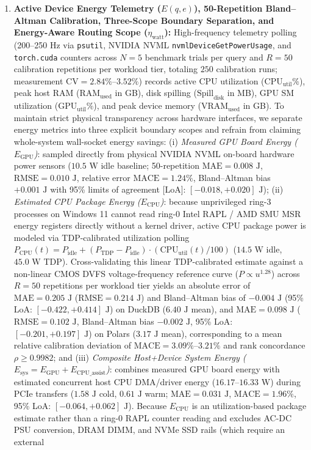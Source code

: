\documentclass[10pt,a4paper]{article}
\begin{document}
\begin{enumerate}[leftmargin=1.5em,itemsep=3pt]
\begin{equation}
    \end{equation}
    \item \textbf{Active Device Energy Telemetry ($E(q,e)$), 50-Repetition Bland--Altman Calibration, Three-Scope Boundary Separation, and Energy-Aware Routing Scope ($\eta_{\text{watt}}$):} High-frequency telemetry polling (200--250 Hz via \texttt{psutil}, NVIDIA NVML \texttt{nvmlDeviceGetPowerUsage}, and \texttt{torch.cuda} counters across $N=5$ benchmark trials per query and $R=50$ calibration repetitions per workload tier, totaling $250$ calibration runs; measurement $\text{CV} = 2.84\%\text{--}3.52\%$) records active CPU utilization ($\text{CPU}_{\text{util}}\%$), peak host RAM ($\text{RAM}_{\text{used}}$ in GB), disk spilling ($\text{Spill}_{\text{disk}}$ in MB), GPU SM utilization ($\text{GPU}_{\text{util}}\%$), and peak device memory ($\text{VRAM}_{\text{used}}$ in GB). To maintain strict physical transparency across hardware interfaces, we separate energy metrics into three explicit boundary scopes and refrain from claiming whole-system wall-socket energy savings: (i) \emph{Measured GPU Board Energy ($E_{\text{GPU}}$)}: sampled directly from physical NVIDIA NVML on-board hardware power sensors ($10.5\text{ W}$ idle baseline; 50-repetition $\text{MAE} = 0.008\text{ J}$, $\text{RMSE} = 0.010\text{ J}$, relative error $\text{MACE} = 1.24\%$, Bland--Altman bias $+0.001\text{ J}$ with 95\% limits of agreement [LoA]: $[-0.018, +0.020]\text{ J}$); (ii) \emph{Estimated CPU Package Energy ($E_{\text{CPU}}$)}: because unprivileged ring-3 processes on Windows 11 cannot read ring-0 Intel RAPL / AMD SMU MSR energy registers directly without a kernel driver, active CPU package power is modeled via TDP-calibrated utilization polling $P_{\text{CPU}}(t) = P_{\text{idle}} + (P_{\text{TDP}} - P_{\text{idle}})\cdot(\text{CPU}_{\text{util}}(t)/100)$ ($14.5\text{ W}$ idle, $45.0\text{ W}$ TDP). Cross-validating this linear TDP-calibrated estimate against a non-linear CMOS DVFS voltage-frequency reference curve ($P \propto u^{1.28}$) across $R=50$ repetitions per workload tier yields an absolute error of $\text{MAE} = 0.205\text{ J}$ ($\text{RMSE} = 0.214\text{ J}$) and Bland--Altman bias of $-0.004\text{ J}$ (95\% LoA: $[-0.422, +0.414]\text{ J}$) on DuckDB ($6.40\text{ J}$ mean), and $\text{MAE} = 0.098\text{ J}$ ($\text{RMSE} = 0.102\text{ J}$, Bland--Altman bias $-0.002\text{ J}$, 95\% LoA: $[-0.201, +0.197]\text{ J}$) on Polars ($3.17\text{ J}$ mean), corresponding to a mean relative calibration deviation of $\text{MACE} = 3.09\%\text{--}3.21\%$ and rank concordance $\rho \ge 0.9982$; and (iii) \emph{Composite Host+Device System Energy ($E_{\text{sys}} = E_{\text{GPU}} + E_{\text{CPU\_assist}}$)}: combines measured GPU board energy with estimated concurrent host CPU DMA/driver energy ($16.17\text{--}16.33\text{ W}$) during PCIe transfers ($1.58\text{ J}$ cold, $0.61\text{ J}$ warm; $\text{MAE} = 0.031\text{ J}$, $\text{MACE} = 1.96\%$, 95\% LoA: $[-0.064, +0.062]\text{ J}$). Because $E_{\text{CPU}}$ is an utilization-based package estimate rather than a ring-0 RAPL counter reading and excludes AC-DC PSU conversion, DRAM DIMM, and NVMe SSD rails (which require an external 
\end{enumerate}
\end{document}
